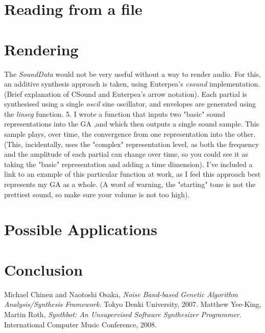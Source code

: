 \documentclass[11pt]{article}
\begin{document}
\section{Reading from a file}

\section{Rendering}
The \emph{SoundData} would not be very useful without a way to render audio. For this, an additive synthesis approach is taken, using Euterpea's \emph{csound} implementation. (Brief explanation of CSound and Euterpea's arrow notation). Each partial is synthesised using a single \emph{oscil} sine oscillator, and envelopes are generated using the \emph{linseg} function.
5. I wrote a function that inputs two "basic" sound representations into the GA ,and which then outputs a single sound sample. This sample plays, over time, the convergence from one representation into the other. (This, incidentally, uses the "complex" representation level, as both the frequency and the amplitude of each partial can change over time, so you could see it as taking the "basic" representation and adding a time dimension). I've included a link to an example of this particular function at work, as I feel this approach best represents my GA as a whole. (A word of warning, the "starting" tone is not the prettiest sound, so make sure your volume is not too high).

\section{Possible Applications}

\section{Conclusion}


\begin{thebibliography}{2}

	  Michael Chinen and Naotoshi Osaka,
	  \emph{Noise Band-based Genetic Algorithm Analysis/Synthesis Framework}.
	  Tokyo Denki University,
	  2007.
	  Matthew Yee-King, Martin Roth,
	  \emph{Synthbot: An Unsupervised Software Synthesizer Programmer}.
	  International Computer Music Conference,
	  2008.

\end{thebibliography}
\end{document}
